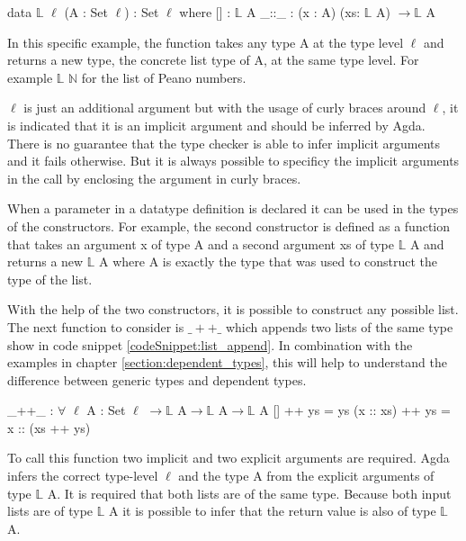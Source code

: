 \begin{codesnippet}[mathescape=true, caption={Definition of the list datatype in Agda}, label={codeSnippet:list_datatype}]
data $\mathbb{L}$ {$\ell$} (A : Set $\ell$) : Set $\ell$ where
  [] : $\mathbb{L}$ A
  _::_ : (x : A) (xs: $\mathbb{L}$ A) $\rightarrow \mathbb{L}$ A
\end{codesnippet}

In this specific example, the function takes any type A at the type level $\ell$ and returns a new type, the concrete list type of A, at the same type level.
For example $\mathbb{L}$ $\mathbb{N}$ for the list of Peano numbers.

$\ell$ is just an additional argument but with the usage of curly braces around $\ell$, it is indicated that it is an implicit argument and should be inferred by Agda.
There is no guarantee that the type checker is able to infer implicit arguments and it fails otherwise.
But it is always possible to specificy the implicit arguments in the call by enclosing the argument in curly braces\cite{norell:deptyped}.

When a parameter in a datatype definition is declared it can be used in the types of the constructors. 
For example, the second constructor is defined as a function that takes an argument x of type A and a second argument xs of type $\mathbb{L}$ A and returns a new $\mathbb{L}$ A where A is exactly the type that was used to construct the type of the list.

With the help of the two constructors, it is possible to construct any possible list. 
The next function to consider is $\_++\_$ which appends two lists of the same type show in code snippet \ref{codeSnippet:list_append}. 
In combination with the examples in chapter \ref{section:dependent_types}, this will help to understand the difference between generic types and dependent types.

\begin{codesnippet}[mathescape=true, caption={Definition of the list append function in Agda}, label={codeSnippet:list_append}]
_++_ : $\forall$ {$\ell$} {A : Set $\ell$} $\rightarrow \mathbb{L}$ A$\rightarrow \mathbb{L}$ A$\rightarrow \mathbb{L}$ A
  []        ++ ys = ys
  (x :: xs) ++ ys = x :: (xs ++ ys)
\end{codesnippet}

To call this function two implicit and two explicit arguments are required. 
Agda infers the correct type-level $\ell$ and the type A from the explicit arguments of type $\mathbb{L}$ A. 
It is required that both lists are of the same type. 
Because both input lists are of type $\mathbb{L}$ A it is possible to infer that the return value is also of type $\mathbb{L}$ A.

